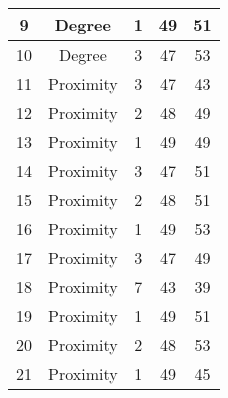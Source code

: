 \documentclass[results.tex]{subfiles}
\begin{document}
\begin{center}
\begin{tabular}{| c || c | c | c | c |}
            \hline
            9                       & Degree                       & 1                      & 49                      & 51                   \\
            \hline
            10                      & Degree                       & 3                      & 47                      & 53                   \\
            \hline
            11                      & Proximity                    & 3                      & 47                      & 43                   \\
            \hline
            12                      & Proximity                    & 2                      & 48                      & 49                   \\
            \hline
            13                      & Proximity                    & 1                      & 49                      & 49                   \\
            \hline
            14                      & Proximity                    & 3                      & 47                      & 51                   \\
            \hline
            15                      & Proximity                    & 2                      & 48                      & 51                   \\
            \hline
            16                      & Proximity                    & 1                      & 49                      & 53                   \\
            \hline
            17                      & Proximity                    & 3                      & 47                      & 49                   \\
            \hline
            18                      & Proximity                    & 7                      & 43                      & 39                   \\
            \hline
            19                      & Proximity                    & 1                      & 49                      & 51                   \\
            \hline
            20                      & Proximity                    & 2                      & 48                      & 53                   \\
            \hline
            21                      & Proximity                    & 1                      & 49                      & 45                   \\

\end{tabular}
\end{center}
\end{document}
